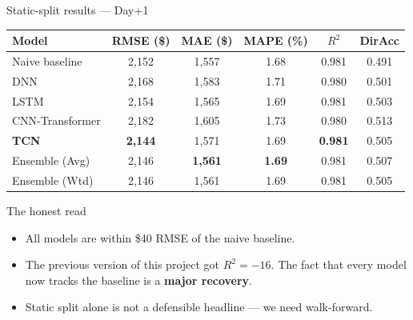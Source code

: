 \documentclass[aspectratio=169]{beamer}
\begin{document}
\begin{frame}{Static-split results --- Day+1}
\footnotesize
\begin{center}
\begin{tabular}{lccccc}
\toprule
\textbf{Model} & \textbf{RMSE (\$)} & \textbf{MAE (\$)} & \textbf{MAPE (\%)} & $R^2$ & \textbf{DirAcc} \\
\midrule
Naive baseline        & 2{,}152 & 1{,}557 & 1.68 & 0.981 & 0.491 \\
DNN                   & 2{,}168 & 1{,}583 & 1.71 & 0.980 & 0.501 \\
LSTM                  & 2{,}154 & 1{,}565 & 1.69 & 0.981 & 0.503 \\
CNN-Transformer       & 2{,}182 & 1{,}605 & 1.73 & 0.980 & 0.513 \\
\rowcolor{accentgreen!20}
\textbf{TCN}          & \textbf{2{,}144} & 1{,}571 & 1.69 & \textbf{0.981} & 0.505 \\
Ensemble (Avg)        & 2{,}146 & \textbf{1{,}561} & \textbf{1.69} & 0.981 & 0.507 \\
Ensemble (Wtd)        & 2{,}146 & 1{,}561 & 1.69 & 0.981 & 0.505 \\
\bottomrule
\end{tabular}
\end{center}

\vspace{0.3cm}
\begin{alertblock}{The honest read}
\begin{itemize}\small
  \item All models are within \$40 RMSE of the naive baseline.
  \item The previous version of this project got $R^2 = -16$. The fact that every model now tracks the baseline is a \textbf{major recovery}.
  \item Static split alone is not a defensible headline --- we need walk-forward.
\end{itemize}
\end{alertblock}
\end{frame}
\end{document}
